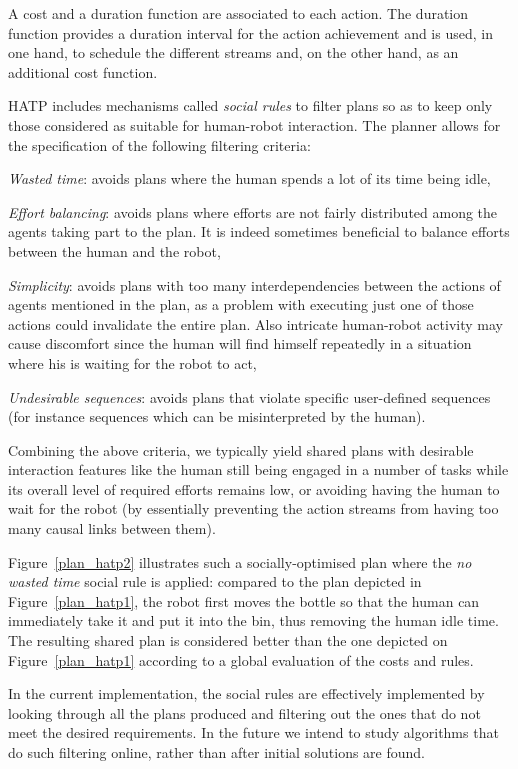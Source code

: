 \documentclass[preprint,3p,times]{elsarticle}
\begin{document}
A cost and a duration function are associated to each action.  The duration
function provides a duration interval for the action achievement and is used, in
one hand, to schedule the different streams and, on the other hand, as an
additional cost function.

HATP includes mechanisms called \emph{social rules} to filter plans so as to
keep only those considered as suitable for human-robot interaction. The planner
allows for the specification of the following filtering criteria:

\emph{Wasted time}: avoids plans where the human spends a lot
of its time being idle,

\emph{Effort balancing}: avoids plans where efforts are
not fairly distributed among the agents taking part to the plan.  It is
indeed sometimes beneficial to balance efforts between the human and
the robot,

\emph{Simplicity}: avoids plans with too many interdependencies
between the actions of agents mentioned in the plan, as a problem with
executing just one of those actions could invalidate the entire
plan. Also intricate human-robot activity may cause discomfort since
the human will find himself repeatedly in a situation where his is
waiting for the robot to act,

\emph{Undesirable sequences}: avoids plans that violate specific user-defined
sequences (for instance sequences which can be misinterpreted by the human).

Combining the above criteria, we typically yield shared plans with desirable
interaction features like the human still being engaged in a number of tasks
while its overall level of required efforts remains low, or avoiding having the
human to wait for the robot (by essentially preventing the action streams from
having too many causal links between them).

Figure~\ref{plan_hatp2} illustrates such a socially-optimised plan where the
\emph{no wasted time} social rule is applied: compared to the plan depicted in
Figure~\ref{plan_hatp1}, the robot first moves the bottle so that the human can
immediately take it and put it into the bin, thus removing the human idle time.
The resulting shared plan is considered better than the one depicted on
Figure~\ref{plan_hatp1} according to a global evaluation of the costs and rules.

In the current implementation, the social rules are effectively
implemented by looking through all the plans produced and filtering
out the ones that do not meet the desired requirements. In the
future we intend to study algorithms that do such filtering online,
rather than after initial solutions are found.
\end{document}
